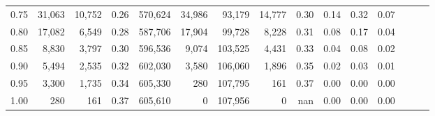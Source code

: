 \begin{tabular}{rrrrrrrrrrrrrrr}
0.75 &  31,063 &  10,752 &  0.26 &  570,624 &   34,986 &   93,179 &   14,777 &  0.30 &  0.14 &  0.32 &      0.07 \\
0.80 &  17,082 &   6,549 &  0.28 &  587,706 &   17,904 &   99,728 &    8,228 &  0.31 &  0.08 &  0.17 &      0.04 \\
0.85 &   8,830 &   3,797 &  0.30 &  596,536 &    9,074 &  103,525 &    4,431 &  0.33 &  0.04 &  0.08 &      0.02 \\
0.90 &   5,494 &   2,535 &  0.32 &  602,030 &    3,580 &  106,060 &    1,896 &  0.35 &  0.02 &  0.03 &      0.01 \\
0.95 &   3,300 &   1,735 &  0.34 &  605,330 &      280 &  107,795 &      161 &  0.37 &  0.00 &  0.00 &      0.00 \\
1.00 &     280 &     161 &  0.37 &  605,610 &        0 &  107,956 &        0 &   nan &  0.00 &  0.00 &      0.00 \\
\bottomrule
\end{tabular}
